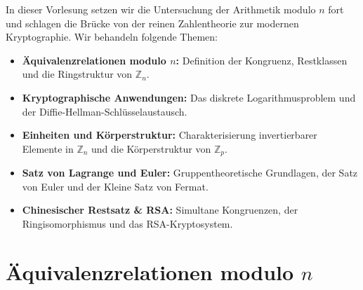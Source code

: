 


\begin{nice-box}
In dieser Vorlesung setzen wir die Untersuchung der Arithmetik modulo $n$ fort und schlagen die Brücke von der reinen Zahlentheorie zur modernen Kryptographie. Wir behandeln folgende Themen:
\begin{itemize}
    \item \textbf{Äquivalenzrelationen modulo $n$:} Definition der Kongruenz, Restklassen und die Ringstruktur von $\mathbb{Z}_n$.
    \item \textbf{Kryptographische Anwendungen:} Das diskrete Logarithmusproblem und der Diffie-Hellman-Schlüsselaustausch.
    \item \textbf{Einheiten und Körperstruktur:} Charakterisierung invertierbarer Elemente in $\mathbb{Z}_n$ und die Körperstruktur von $\mathbb{Z}_p$.
    \item \textbf{Satz von Lagrange und Euler:} Gruppentheoretische Grundlagen, der Satz von Euler und der Kleine Satz von Fermat.
    \item \textbf{Chinesischer Restsatz \& RSA:} Simultane Kongruenzen, der Ringisomorphismus und das RSA-Kryptosystem.
\end{itemize}
\end{nice-box}

\section{Äquivalenzrelationen modulo \texorpdfstring{$n$}{n}}

